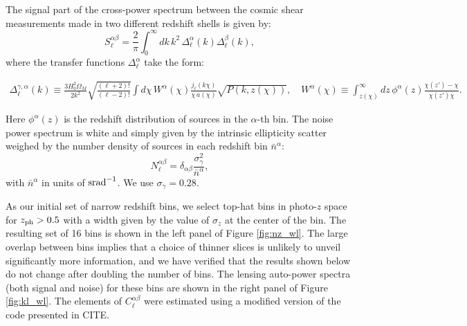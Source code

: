 \documentclass[twocolumn,amsfont,amssymb,amsmath, showpacs,balancelastpage, nofootinbib]{revtex4-1}
\begin{document}
    The signal part of the cross-power spectrum between the cosmic shear measurements made in two different redshift shells is given by:
    \begin{equation}\label{eq:cl_generic}
      S^{\alpha\beta}_\ell=\frac{2}{\pi}\int_0^\infty dk\,k^2\,\Delta^\alpha_\ell(k)\Delta^\beta_\ell(k),
    \end{equation}
    where the transfer functions $\Delta^{\alpha}_\ell$ take the form:
    \begin{widetext}
    \begin{align}
      \Delta^{\gamma,\alpha}_\ell(k)\equiv\frac{3H_0^2\Omega_M}{2k^2}\sqrt{\frac{(\ell+2)!}{(\ell-2)!}}\int d\chi\,W^\alpha(\chi)\frac{j_\ell(k\chi)}{\chi\,a(\chi)}\sqrt{P(k,z(\chi))},\hspace{12pt}
      W^\alpha(\chi)\equiv\int_{z(\chi)}^\infty dz\,\phi^\alpha(z)\frac{\chi(z')-\chi}{\chi(z')\chi}.
    \end{align}
    \end{widetext}
    Here $\phi^\alpha(z)$ is the redshift distribution of sources in the $\alpha$-th bin. The noise power spectrum is white and simply given by the intrinsic ellipticity scatter weighed by the number density of sources in each redshift bin $\bar{n}^\alpha$:
    \begin{equation}
      N^{\alpha\beta}_\ell=\delta_{\alpha\beta}\frac{\sigma_\gamma^2}{\bar{n}^\alpha},
    \end{equation}
    with $\bar{n}^\alpha$ in units of ${\rm srad}^{-1}$. We use $\sigma_\gamma=0.28$.
    
    As our initial set of narrow redshift bins, we select top-hat bins in photo-$z$ space for $z_{\rm ph}>0.5$ with a width given by the value of $\sigma_z$ at the center of the bin. The resulting set of 16 bins is shown in the left panel of Figure \ref{fig:nz_wl}. The large overlap between bins implies that a choice of thinner slices is unlikely to unveil significantly more information, and we have verified that the results shown below do not change after doubling the number of bins. The lensing auto-power spectra (both signal and noise) for these bins are shown in the right panel of Figure \ref{fig:kl_wl}. The elements of $C^{\alpha\beta}_\ell$ were estimated using a modified version of the code presented in CITE.
    
\end{document}
